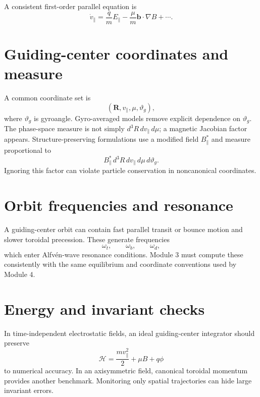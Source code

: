 \documentclass[11pt]{article}
\begin{document}
A consistent first-order parallel equation is
\begin{equation}
\boxed{\dot v_\parallel=\frac{q}{m}E_\parallel-
\frac{\mu}{m}\mathbf b\cdot\nabla B+\cdots.}
\end{equation}

\section{Guiding-center coordinates and measure}
A common coordinate set is
\begin{equation}
(\mathbf R,v_\parallel,\mu,\vartheta_g),
\end{equation}
where $\vartheta_g$ is gyroangle. Gyro-averaged models remove explicit dependence on $\vartheta_g$. The phase-space measure is not simply $d^3R\,dv_\parallel\,d\mu$; a magnetic Jacobian factor appears. Structure-preserving formulations use a modified field $B_\parallel^*$ and measure proportional to
\begin{equation}
B_\parallel^*\,d^3R\,dv_\parallel\,d\mu\,d\vartheta_g.
\end{equation}
Ignoring this factor can violate particle conservation in noncanonical coordinates.

\section{Orbit frequencies and resonance}
A guiding-center orbit can contain fast parallel transit or bounce motion and slower toroidal precession. These generate frequencies
\begin{equation}
\omega_t,\qquad\omega_b,\qquad\omega_d,
\end{equation}
which enter Alfv\'en-wave resonance conditions. Module 3 must compute these consistently with the same equilibrium and coordinate conventions used by Module 4.

\section{Energy and invariant checks}
In time-independent electrostatic fields, an ideal guiding-center integrator should preserve
\begin{equation}
\mathcal H=\frac{mv_\parallel^2}{2}+\mu B+q\phi
\end{equation}
to numerical accuracy. In an axisymmetric field, canonical toroidal momentum provides another benchmark. Monitoring only spatial trajectories can hide large invariant errors.
\end{document}
